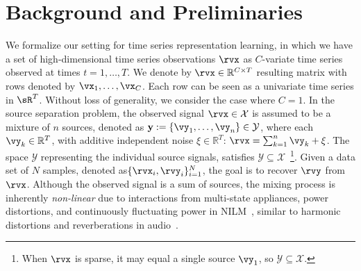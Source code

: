 \documentclass{article} %
\theoremstyle{plain}
\theoremstyle{definition}
\theoremstyle{remark}
\numberwithin{equation}{section}
\begin{document}



\section{Background and Preliminaries}\label{sec: Problem set up}

We formalize our setting for time series representation learning, in which we have a set of high-dimensional time series observations $\rvx$ as $C$-variate time series observed at times
$t=1,\dots, T$. We denote by
$\rvx \in \mathbb{R}^{C \times T}$ resulting matrix with rows denoted by $\vx_1,\dots,\vx_C$. Each row can be seen as a univariate time series in $\sR^{T}$. Without loss of generality, we consider the case where $C = 1$. In the source separation problem, the observed signal $\rvx \in \mathcal{X}$ is assumed to be a mixture of $n$ sources, denoted as $\mathbf{y} := \{\vy_1, \dots, \vy_n\} \in \mathcal{Y}$, where each $\vy_k \in \mathbb{R}^{T}$, with additive independent noise $\xi \in \mathbb{R}^{T}$: $\rvx = \sum_{k=1}^{n} \vy_k + \xi$. The space $\mathcal{Y}$ representing the individual source signals, satisfies $\mathcal{Y} \subseteq \mathcal{X}$~\footnote{When $\rvx$ is sparse, it may equal a single source $\vy_1$, so $\mathcal{Y} \subseteq \mathcal{X}$.}. Given a data set of $N$ samples,  denoted as$\{\rvx_i, \rvy_i\}_{i=1}^{N}$, the goal is to recover $\rvy$ from $\rvx$. Although the observed signal is a sum of sources, the mixing process is inherently \textit{non-linear} due to interactions from multi-state appliances, power distortions, and continuously fluctuating power in NILM~\citep{yue_bert4nilm_2020}, similar to harmonic distortions and reverberations in audio~\citep{lu2021nonlinear}.
\end{document}
